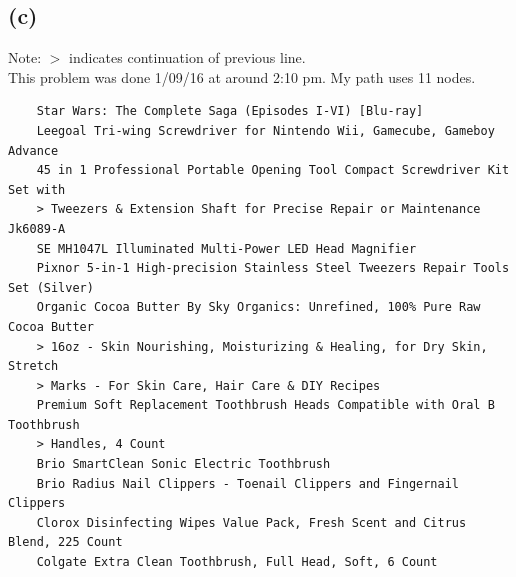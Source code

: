 \documentclass{article}
\begin{document}
\subsection*{(c)}
Note: $>$ indicates continuation of previous line. \\
This problem was done 1/09/16 at around 2:10 pm. My path uses 11 nodes.
\begin{verbatim}
    Star Wars: The Complete Saga (Episodes I-VI) [Blu-ray]
    Leegoal Tri-wing Screwdriver for Nintendo Wii, Gamecube, Gameboy Advance
    45 in 1 Professional Portable Opening Tool Compact Screwdriver Kit Set with 
    > Tweezers & Extension Shaft for Precise Repair or Maintenance Jk6089-A
    SE MH1047L Illuminated Multi-Power LED Head Magnifier
    Pixnor 5-in-1 High-precision Stainless Steel Tweezers Repair Tools Set (Silver)
    Organic Cocoa Butter By Sky Organics: Unrefined, 100% Pure Raw Cocoa Butter 
    > 16oz - Skin Nourishing, Moisturizing & Healing, for Dry Skin, Stretch 
    > Marks - For Skin Care, Hair Care & DIY Recipes 
    Premium Soft Replacement Toothbrush Heads Compatible with Oral B Toothbrush 
    > Handles, 4 Count
    Brio SmartClean Sonic Electric Toothbrush
    Brio Radius Nail Clippers - Toenail Clippers and Fingernail Clippers
    Clorox Disinfecting Wipes Value Pack, Fresh Scent and Citrus Blend, 225 Count
    Colgate Extra Clean Toothbrush, Full Head, Soft, 6 Count
\end{verbatim}
\end{document}
